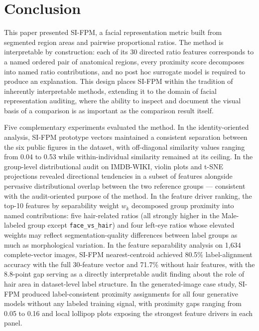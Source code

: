 \documentclass{article}
\begin{document}
\section{Conclusion}
\label{conclusion}

This paper presented SI-FPM, a facial representation metric built from segmented region areas and pairwise proportional ratios. The method is interpretable by construction: each of its 30 directed ratio features corresponds to a named ordered pair of anatomical regions, every proximity score decomposes into named ratio contributions, and no post hoc surrogate model is required to produce an explanation. This design places SI-FPM within the tradition of inherently interpretable methods, extending it to the domain of facial representation auditing, where the ability to inspect and document the visual basis of a comparison is as important as the comparison result itself.

Five complementary experiments evaluated the method. In the identity-oriented analysis, SI-FPM prototype vectors maintained a consistent separation between the six public figures in the dataset, with off-diagonal similarity values ranging from 0.04 to 0.53 while within-individual similarity remained at its ceiling. In the group-level distributional audit on IMDB-WIKI, violin plots and t-SNE projections revealed directional tendencies in a subset of features alongside pervasive distributional overlap between the two reference groups — consistent with the audit-oriented purpose of the method. In the feature driver ranking, the top-10 features by separability weight $w_k$ decomposed group proximity into named contributions: five hair-related ratios (all strongly higher in the Male-labeled group except \texttt{face\_vs\_hair}) and four left-eye ratios whose elevated weights may reflect segmentation-quality differences between label groups as much as morphological variation. In the feature separability analysis on 1,634 complete-vector images, SI-FPM nearest-centroid achieved 80.5\% label-alignment accuracy with the full 30-feature vector and 71.7\% without hair features, with the 8.8-point gap serving as a directly interpretable audit finding about the role of hair area in dataset-level label structure. In the generated-image case study, SI-FPM produced label-consistent proximity assignments for all four generative models without any labeled training signal, with proximity gaps ranging from 0.05 to 0.16 and local lollipop plots exposing the strongest feature drivers in each panel.
\end{document}
